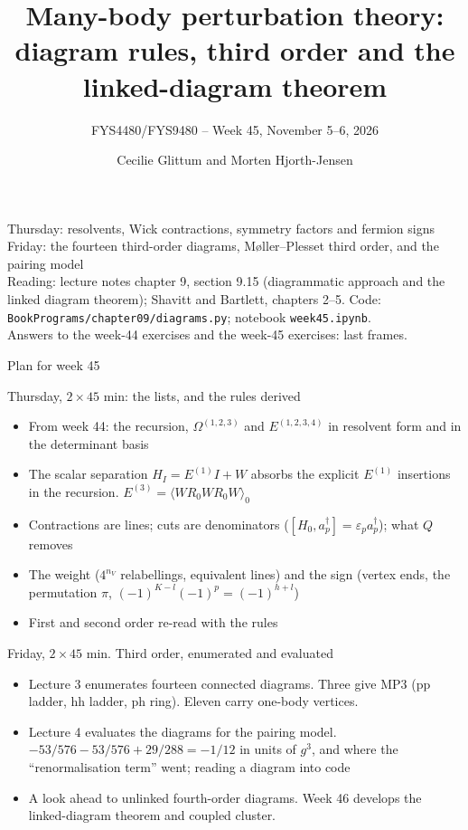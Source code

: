 \documentclass[aspectratio=169,10pt]{beamer}
\title{Many-body perturbation theory: diagram rules, third order and the linked-diagram theorem}
\subtitle{FYS4480/FYS9480 -- Week 45, November 5--6, 2026}
\author{Cecilie Glittum and Morten Hjorth-Jensen}
\institute{Department of Physics,\\
University of Oslo, Norway}
\date{}
\newcommand{\av}[1]{\langle #1\rangle_0}
\newcommand{\cre}[1]{a_{#1}^{\dagger}}
\begin{document}
\begin{frame}[plain]
  \vfill
  \begin{center}\small
  Thursday: resolvents, Wick contractions, symmetry factors and fermion signs\\
  Friday: the fourteen third-order diagrams, M\o ller--Plesset third order, and the pairing model\\[0.55em]
  {\footnotesize Reading: lecture notes chapter 9, section 9.15 (diagrammatic approach and the linked diagram theorem); Shavitt and Bartlett, chapters 2--5. Code: \texttt{BookPrograms/chapter09/diagrams.py}; notebook \texttt{week45.ipynb}.\\[0.2em]
  Answers to the week-44 exercises and the week-45 exercises: last frames.}
  \end{center}
\end{frame}

\begin{frame}[shrink=12]{Plan for week 45}
  \begin{block}{Thursday, $2\times45$ min: the lists, and the rules derived}
    \begin{itemize}
      \item From week 44: the recursion, $\Omega^{(1,2,3)}$ and $E^{(1,2,3,4)}$ in resolvent form and in the determinant basis
      \item The scalar separation $H_I=E^{(1)}I+W$ absorbs the explicit $E^{(1)}$ insertions in the recursion. $E^{(3)}=\av{WR_0WR_0W}$
      \item Contractions are lines; cuts are denominators ($[H_0,\cre{p}]=\varepsilon_p\cre{p}$); what $Q$ removes
      \item The weight ($4^{n_V}$ relabellings, equivalent lines) and the sign (vertex ends, the permutation $\pi$, $(-1)^{K-l}(-1)^p=(-1)^{h+l}$)
      \item First and second order re-read with the rules
    \end{itemize}
  \end{block}
  \begin{block}{Friday, $2\times45$ min. Third order, enumerated and evaluated}
    \begin{itemize}
      \item Lecture 3 enumerates fourteen connected diagrams. Three give MP3 (pp ladder, hh ladder, ph ring). Eleven carry one-body vertices.
      \item Lecture 4 evaluates the diagrams for the pairing model. $-53/576-53/576+29/288=-1/12$ in units of $g^3$, and where the ``renormalisation term'' went; reading a diagram into code
      \item A look ahead to unlinked fourth-order diagrams. Week 46 develops the linked-diagram theorem and coupled cluster.
    \end{itemize}
  \end{block}
\end{frame}
\end{document}
